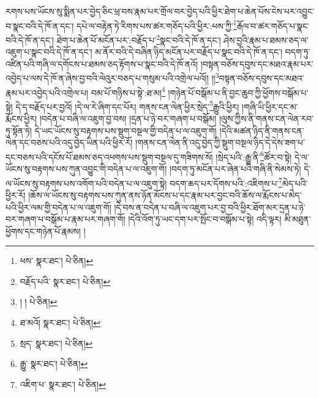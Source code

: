 རགས་པས་ཡོངས་སུ་སྨིན་པར་བྱེད་ཅིང་ཕྲ་བས་རྣམ་པར་གྲོལ་བར་བྱེད་པའི་ཕྱིར་ཐེག་པ་ཆེན་པོས་ངེས་པར་འབྱུང་བ་སྣང་བའི་དེ་ཁོ་ན་དང་། དཔེ་ལ་བརྟེན་ཏེ་རིགས་པས་ཚར་གཅོད་པའི་ཕྱིར་:ཕས་ཀྱི་\footnote{ཕས་  སྣར་ཐང་།  པེ་ཅིན། }རྒོལ་བ་ཚར་གཅོད་པ་སྣང་བའི་དེ་ཁོ་ན་དང་། ཐེག་པ་ཆེན་པོ་མངོན་པར་:བརྗོད་པ་\footnote{བརྗོད་པའི་  སྣར་ཐང་།  པེ་ཅིན། }སྣང་བའི་དེ་ཁོ་ན་དང་། ཤེས་བྱའི་རྣམ་པ་ཐམས་ཅད་ལ་འཇུག་པ་སྣང་བའི་དེ་ཁོ་ན་དང་། མ་ནོར་བའི་དེ་བཞིན་ཉིད་མངོན་པར་བརྗོད་པ་སྣང་བའི་དེ་ཁོ་ན་དང་། བདག་ཏུ་འཛིན་པའི་གཞི་ལ་དགོངས་པ་ཐམས་ཅད་རྟོགས་པ་སྣང་བའི་དེ་ཁོ་ནའོ། །བསྟན་བཅོས་དབུས་དང་མཐའ་རྣམ་པར་འབྱེད་པ་ལས་དེ་ཁོ་ན་ཞེས་བྱ་བའི་ལེའུར་བཅད་པ་གསུམ་པའི་འགྲེལ་པའོ།། །།\footnote{། །  པེ་ཅིན། }བསྟན་བཅོས་དབུས་དང་མཐའ་རྣམ་པར་འབྱེད་པའི་འགྲེལ་པ། བམ་པོ་གཉིས་པ་སྟེ་:ཐ་མ།\footnote{ཐ་མའོ།  སྣར་ཐང་།  པེ་ཅིན། } །གཉེན་པོ་བསྒོམ་པ་ནི་བྱང་ཆུབ་ཀྱི་ཕྱོགས་བསྒོམ་པ་སྟེ། དེ་ད་བརྗོད་པར་བྱའོ། །དེ་ལ་རེ་ཞིག་དང་པོར། གནས་ངན་ལེན་ཕྱིར་སྲེད་\footnote{སྲད་  སྣར་ཐང་།  པེ་ཅིན། }རྒྱུའི་ཕྱིར། །གཞི་ཡི་ཕྱིར་དང་མ་རྨོངས་ཕྱིར། །བདེན་པ་བཞི་ལ་འཇུག་བྱ་བས། །དྲན་པ་ཉེ་བར་གཞག་པ་བསྒོམ། །ལུས་ཀྱིས་ནི་གནས་ངན་ལེན་རབ་ཏུ་སྟོན་ཏེ། དེ་ཡང་ཡོངས་སུ་བརྟགས་པས་སྡུག་བསྔལ་གྱི་བདེན་པ་ལ་འཇུག་གོ། །དེའི་མཚན་ཉིད་ནི་གནས་ངན་ལེན་དང་བཅས་པའི་འདུ་བྱེད་ཡིན་པའི་ཕྱིར་རོ། །གནས་ངན་ལེན་ནི་འདུ་བྱེད་ཀྱི་སྡུག་བསྔལ་ཉིད་དེ་དེས་ཟག་པ་དང་བཅས་པའི་དངོས་པོ་ཐམས་ཅད་འཕགས་པས་སྡུག་བསྔལ་དུ་གཟིགས་སོ། །སྲེད་པའི་:རྒྱུ་ནི་\footnote{རྒྱུ་  སྣར་ཐང་།  པེ་ཅིན། }ཚོར་བ་སྟེ། དེ་ལ་ཡོངས་སུ་བརྟགས་པས་ཀུན་འབྱུང་གི་བདེན་པ་ལ་འཇུག་གོ། །བདག་ཏུ་མངོན་པར་ཞེན་པའི་གཞི་ནི་སེམས་ཏེ། དེ་ལ་ཡོངས་སུ་བརྟགས་པས་འགོག་པའི་བདེན་པ་ལ་འཇུག་སྟེ། བདག་ཆད་པར་དོགས་པའི་:འཇིགས་པ་\footnote{འཇིག་པ་  སྣར་ཐང་།  པེ་ཅིན། }མེད་པའི་ཕྱིར་རོ། །ཆོས་ལ་ཡོངས་སུ་བརྟགས་པས་ཀུན་ནས་ཉོན་མོངས་པ་དང་རྣམ་པར་བྱང་བའི་ཆོས་ལ་རྨོངས་པ་མེད་པའི་ཕྱིར་ལམ་གྱི་བདེན་པ་ལ་འཇུག་གོ། །དེ་བས་ན་བདེན་པ་བཞི་ལ་འཇུག་པར་བྱ་བའི་ཕྱིར་ཐོག་མར་དྲན་པ་ཉེ་བར་གཞག་པ་བསྒོམ་པ་རྣམ་པར་གཞག་གོ། །དེའི་འོག་ཏུ་ཡང་དག་པར་སྤོང་བ་བསྒོམ་པ་སྟེ། འདི་ལྟར། མི་མཐུན་ཕྱོགས་དང་གཉེན་པོ་རྣམས། །
